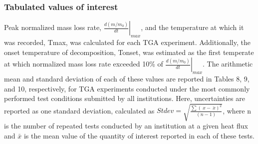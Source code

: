 \documentclass{book}
\begin{document}
\subsubsection{Tabulated values of interest}

Peak normalized mass loss rate, $\left.\frac{d\left(m/m_0\right)}{dt}\right|_{max}$, and the temperature at which it was recorded, Tmax, was calculated for each TGA experiment. Additionally, the onset temperature of decomposition, Tonset, was estimated as the first temperate at which normalized mass loss rate exceeded 10\% of $\left.\frac{d\left(m/m_0\right)}{dt}\right|_{max}$. The arithmetic mean and standard deviation of each of these values are reported in Tables 8, 9, and 10, respectively, for TGA experiments conducted under the most commonly performed test conditions submitted by all institutions. Here, uncertainties are reported as one standard deviation, calculated as $Stdev=\sqrt{\frac{\sum\left(\ x-\bar{\ x}\right)^2}{(n-1)}}$, where n is the number of repeated tests conducted by an institution at a given heat flux and $\bar{x}$ is the mean  value of the quantity of interest reported in each of these tests.
\end{document}
